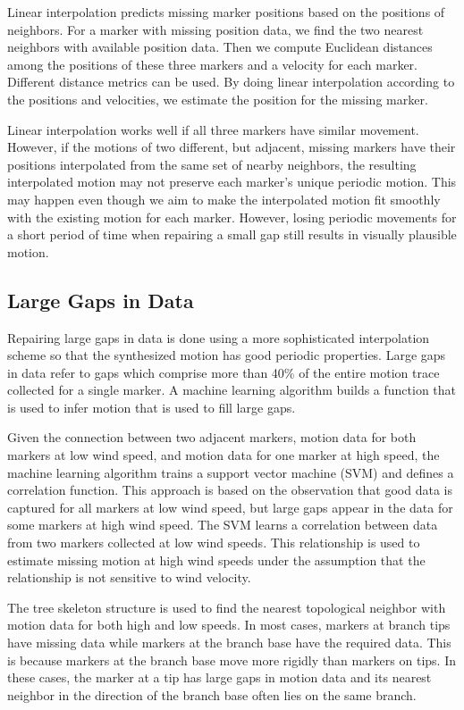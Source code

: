 Linear interpolation predicts missing marker positions based on the positions of neighbors. For a marker with missing position data, we find the two nearest neighbors with available position data. Then we compute Euclidean distances among the positions of these three markers and a velocity for each marker. Different distance metrics can be used. By doing linear interpolation according to the positions and velocities, we estimate the position for the missing marker. 

Linear interpolation works well if all three markers have similar movement. However, if the motions of two different, but adjacent, missing markers have their positions interpolated from the same set of nearby neighbors, the resulting interpolated motion may not preserve each marker's unique periodic motion. This may happen even though we aim to make the interpolated motion fit smoothly with the existing motion for each marker. However, losing periodic movements for a short period of time when repairing a small gap still results in visually plausible motion. 

\subsection{Large Gaps in Data}

Repairing large gaps in data is done using a more sophisticated interpolation scheme so that the synthesized motion has good periodic properties.  Large gaps in data refer to gaps which comprise more than 40\% of the entire motion trace collected for a single marker. A machine learning algorithm builds a function that is used to infer motion that is used to fill large gaps.  

Given the connection between two adjacent markers, motion data for both markers at low wind speed, and motion data for one marker at high speed, the machine learning algorithm trains a support vector machine (SVM) and defines a correlation function. This approach is based on the observation that good data is captured for all markers at low wind speed, but large gaps appear in the data for some markers at high wind speed.  The SVM learns a correlation between data from two markers collected at low wind speeds.  This relationship is used to estimate missing motion at high wind speeds under the assumption that the relationship is not sensitive to wind velocity.

The tree skeleton structure is used to find the nearest topological neighbor with motion data for both high and low speeds. In most cases, markers at branch tips have missing data while markers at the branch base have the required data. This is because markers at the branch base move more rigidly than markers on tips. In these cases, the marker at a tip has large gaps in motion data and its nearest neighbor in the direction of the branch base often lies on the same branch.

